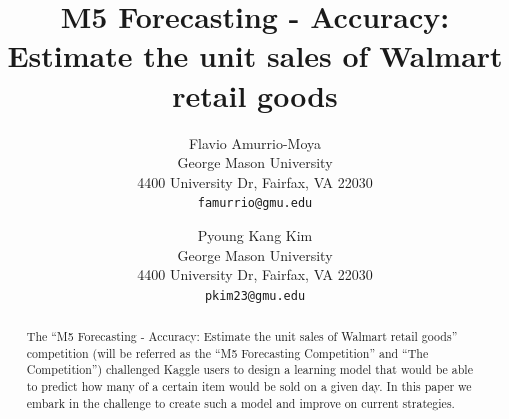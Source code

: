 \documentclass[10pt,twocolumn,letterpaper]{article}
\begin{document}
\title{M5 Forecasting - Accuracy: Estimate the unit sales of Walmart retail goods}

\author{Flavio Amurrio-Moya\\
George Mason University\\
4400 University Dr, Fairfax, VA 22030\\
{\tt\small famurrio@gmu.edu}
\and
Pyoung Kang Kim\\
George Mason University\\
4400 University Dr, Fairfax, VA 22030\\
{\tt\small pkim23@gmu.edu}
}

\maketitle
\thispagestyle{empty}


\begin{abstract}
   The ``M5 Forecasting - Accuracy: Estimate the unit sales of Walmart retail
   goods'' competition (will be referred as the ``M5 Forecasting Competition''
   and ``The Competition'') challenged Kaggle users to design a learning model
   that would be able to predict how many of a certain item would be sold
   on a given day. In this paper we embark in the challenge to create such a
   model and improve on current strategies.
\end{abstract}
\end{document}
